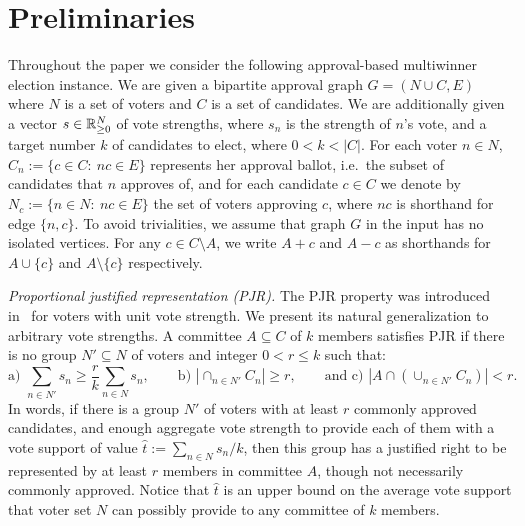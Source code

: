 \section{Preliminaries}\label{s:prel}

Throughout the paper we consider the following approval-based multiwinner election instance. 
We are given a bipartite approval graph $G=(N\cup C, E)$ where $N$ is a set of voters and $C$ is a set of candidates. 
We are additionally given a vector $s\in\mathbb{R}_{\geq 0}^N$ of vote strengths, where $s_n$ is the strength of $n$'s vote, and a target number $k$ of candidates to elect, where $0< k<|C|$.
For each voter $n\in N$, $C_n:=\{c\in C: \ nc\in E\}$ represents her approval ballot, i.e.~the subset of candidates that $n$ approves of, and for each candidate $c\in C$ we denote by $N_c:=\{n\in N: \ nc\in E\}$ the set of voters approving $c$, where $nc$ is shorthand for edge $\{n,c\}$. 
To avoid trivialities, we assume that graph $G$ in the input has no isolated vertices. 
For any $c\in C\setminus A$, we write $A+c$ and $A-c$ as shorthands for $A\cup\{c\}$ and $A\setminus \{c\}$ respectively. 

\emph{Proportional justified representation (PJR).} 
The PJR property was introduced in~\cite{sanchez2017proportional} for voters with unit vote strength. We present its natural generalization to arbitrary vote strengths. A committee $A\subseteq C$ of $k$ members satisfies PJR if there is no group $N'\subseteq N$ of voters and integer $0<r\leq k$ such that:
%
$$\text{a) } \sum_{n\in N'} s_n \geq \frac{r}{k} \sum_{n\in N}s_n, \quad \quad \text{b) } |\cap_{n\in N'} C_n|\geq r, 
\quad \quad \text{and c) } |A\cap (\cup_{n\in N'} C_n)|<r.$$
%
In words, if there is a group $N'$ of voters with at least $r$ commonly approved candidates, and enough aggregate vote strength to provide each of them with a vote support of value $\hat{t}:=\sum_{n\in N} s_n / k$, then this group has a justified right to be represented by at least $r$ members in committee $A$, though not necessarily commonly approved. 
Notice that $\hat{t}$ is an upper bound on the average vote support that voter set $N$ can possibly provide to any committee of $k$ members. 


